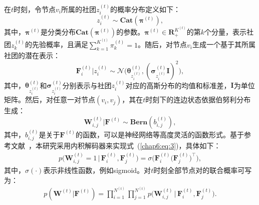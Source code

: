 在$t$时刻，令节点$v_i$所属的社团$z_i^{(t)}$的概率分布定义如下：
\begin{equation}
z_i^{(t)} \sim \bm{Cat}(\bm{\pi}^{(t)}),
\label{eq:1}
\end{equation}
其中，$\bm{\pi}^{(t)}$是分类分布$\bm{Cat}(\bm{\pi}^{(t)})$的参数。$\bm{\pi}^{(t)} \in \boldsymbol{R}_{+}^{K^{(t)}}$的第$k$个分量，表示社团$z_k^{(t)}$的先验概率，且满足$\sum\nolimits_{k=1}^{K^{(t)}}{\pi_{k}^{(t)}}=1$。随后，对节点$v_i$生成一个基于其所属社团的潜在表示：
\begin{equation}
\mathbf{F}_i^{(t)} \Big| z_i^{(t)} \sim \bm{\mathcal{N}} \big(\bm{\theta}_{z_i^{(t)}}^{(t)}, (\bm{\sigma}_{z_i^{(t)}}^{(t)}\mathbf{I})^{2}\big),
\label{eq:2}
\end{equation}
其中，$\bm{\theta}_{z_i^{(t)}}^{(t)}$和$\bm{\sigma}_{z_i^{(t)}}^{(t)}$分别表示与社团$z_i^{(t)}$对应的高斯分布的均值和标准差，$\mathbf{I}$为单位矩阵。然后，对任意一对节点$(v_i,v_j)$，其在$t$时刻下的连边状态依据伯努利分布生成：
\begin{equation}
    \mathbf{W}^{(t)}_{i,j} \Big| \mathbf{F}^{(t)} \sim \bm{Bern}(b_{i,j}^{(t)}),
\label{chap6:eq:3}
\end{equation}
其中，$b_{i,j}^{(t)}$是关于$\mathbf{F}^{(t)}$的函数，可以是神经网络等高度灵活的函数形式。基于参考文献~\cite{mrabah2024contrastive}，本研究采用内积解码器来实现式~(\ref{chap6:eq:3})，具体如下：
\begin{align}
        p\big(\mathbf{W}^{(t)}_{i,j} =1 \,\big|\, \mathbf{F}_{i}^{(t)}, \mathbf{F}_{j}^{(t)}\big) 
        =  \sigma\Big(\mathbf{F}_{i}^{(t)}\big(\mathbf{F}_{j}^{(t)}\big)^{\top}\Big),
\label{eq:4}
\end{align}
其中，$\sigma(\cdot)$表示非线性函数，例如sigmoid。对$t$时刻全部节点对的联合概率可写为：
\begin{align}
        p(\mathbf{W}^{(t)} \big| \mathbf{F}^{(t)})  
        = \prod \limits_{i=1}^{N^{(t)}} \prod \limits_{j=1}^{N^{(t)}} p\big(\mathbf{W}_{i,j}^{(t)} \,\big|\, \mathbf{F}_{i}^{(t)}, \mathbf{F}_{j}^{(t)}\big).
\label{eq:5}
\end{align}

